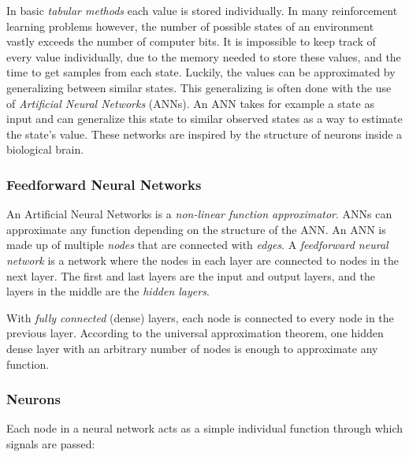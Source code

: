 
In basic \textit{tabular methods} each value is stored individually. In many reinforcement learning problems however, the number of possible states of an environment vastly exceeds the number of computer bits. It is impossible to keep track of every value individually, due to the memory needed to store these values, and the time to get samples from each state. Luckily, the values can be approximated by generalizing between similar states. This generalizing is often done with the use of \textit{Artificial Neural Networks} (ANNs). An ANN takes for example a state as input and can generalize this state to similar observed states as a way to estimate the state's value. These networks are inspired by the structure of neurons inside a biological brain.

\subsubsection*{Feedforward Neural Networks}

An Artificial Neural Networks is a \textit{non-linear function approximator}. ANNs can approximate any function depending on the structure of the ANN. An ANN is made up of multiple \textit{nodes} that are connected with \textit{edges}. A \textit{feedforward neural network} is a network where the nodes in each layer are connected to nodes in the next layer. The first and last layers are the input and output layers, and the layers in the middle are the \textit{hidden layers}. 


With \textit{fully connected} (dense) layers, each node is connected to every node in the previous layer. According to the universal approximation theorem, one hidden dense layer with an arbitrary number of nodes is enough to approximate any function.







\subsubsection*{Neurons}

Each node in a neural network acts as a simple individual function through which signals are passed:

